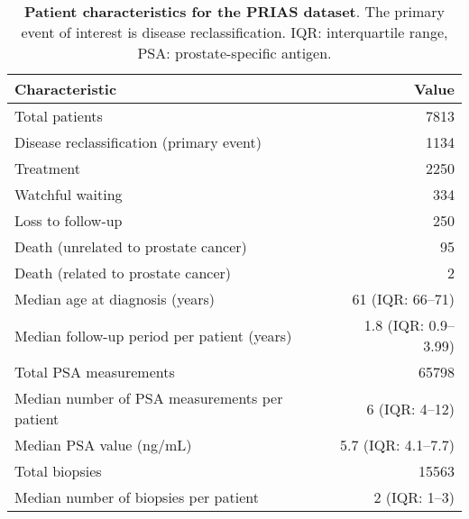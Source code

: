 \begin{table}
\small\sf\centering
\caption{\textbf{Patient characteristics for the PRIAS dataset}. The primary event of interest is disease reclassification. IQR: interquartile range, PSA: prostate-specific antigen.}
\label{table:prias_summary}
\begin{tabular}{lr}
\hline
\hline
Characteristic & Value\\
\hline
Total patients & 7813\\
Disease reclassification (primary event) & 1134\\
Treatment & 2250\\
Watchful waiting & 334\\
Loss to follow-up & 250\\
Death (unrelated to prostate cancer) & 95\\
Death (related to prostate cancer) & 2\\
\hline
Median age at diagnosis (years) & 61 (IQR: 66--71)\\
Median follow-up period per patient (years) &  1.8 (IQR: 0.9--3.99)\\
Total PSA measurements & 65798\\
Median number of PSA measurements per patient &  6 (IQR: 4--12)\\
Median PSA value (ng/mL) & 5.7 (IQR: 4.1--7.7)\\
Total biopsies & 15563\\
Median number of biopsies per patient &  2 (IQR: 1--3)\\
\hline
\end{tabular}
\end{table}